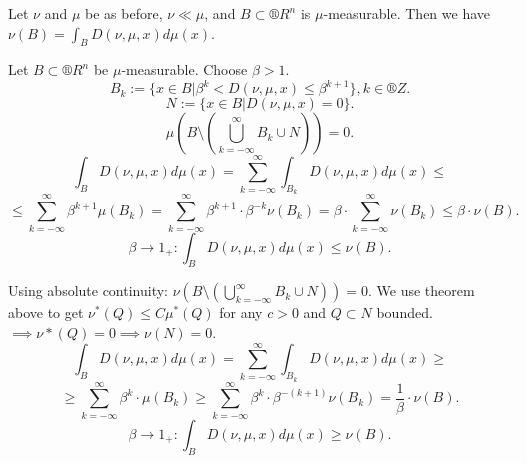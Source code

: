 \documentclass[12pt]{article}					%
\begin{document}
\begin{veta}
	Let $\nu$ and $\mu$ be as before, $\nu \ll \mu$, and $B \subset ®R^n$ is $\mu$-measurable. Then we have $\nu(B) = \int_B D(\nu, \mu, x) d\mu(x)$.

	\begin{dukazin}
		Let $B \subset ®R^n$ be $\mu$-measurable. Choose $\beta > 1$.
		$$ B_k := \{x \in B | \beta^k < D(\nu, \mu, x) ≤ \beta^{k + 1}\}, k \in ®Z. $$
		$$ N := \{x \in B | D(\nu, \mu, x) = 0\}. $$
		$$ \mu(B \setminus (\bigcup_{k=-∞}^∞ B_k \cup N)) = 0. $$
		$$ \int_B D(\nu, \mu, x) d\mu(x) = \sum_{k=-∞}^∞ \int_{B_k} D(\nu, \mu, x) d\mu(x) ≤ $$
		$$ ≤ \sum_{k=-∞}^∞ \beta^{k+1} \mu(B_k) = \sum_{k=-∞}^∞ \beta^{k + 1} · \beta^{-k} \nu(B_k) = \beta · \sum_{k=-∞}^∞ \nu(B_k) ≤ \beta · \nu(B). $$
		$$ \beta \rightarrow 1_+: \int_B D(\nu, \mu, x) d\mu(x) ≤ \nu(B). $$

		Using absolute continuity: $\nu(B \setminus (\bigcup_{k=-∞}^∞ B_k \cup N)) = 0$. We use theorem above to get $\nu^*(Q) ≤ C \mu^*(Q)$ for any $c > 0$ and $Q \subset N$ bounded. $\implies \nu*(Q) = 0 \implies \nu(N) = 0$.
		$$ \int_B D(\nu, \mu, x) d\mu(x) = \sum_{k=-∞}^∞ \int_{B_k} D(\nu, \mu, x) d\mu(x) ≥ $$
		$$ ≥ \sum_{k=-∞}^∞ \beta^k · \mu(B_k) ≥ \sum_{k=-∞}^∞ \beta^k · \beta^{-(k+1)} \nu(B_k) = \frac{1}{\beta}·\nu(B). $$
		$$ \beta \rightarrow 1_+: \int_B D(\nu, \mu, x) d\mu(x) ≥ \nu(B). $$	
	\end{dukazin}
\end{veta}
\end{document}
